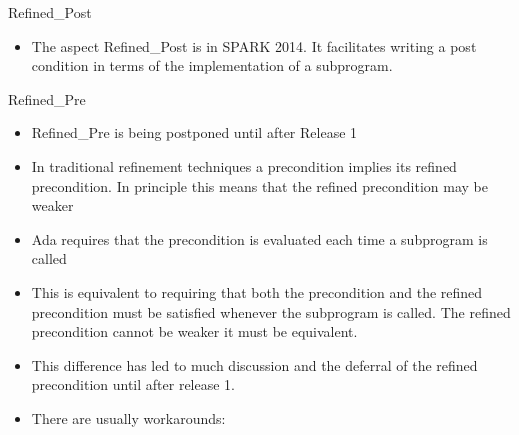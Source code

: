 \documentclass{beamer}
\begin{document}
\begin{frame}{Refined\_Post}

  \begin{itemize}
  \item The aspect Refined\_Post is in SPARK 2014.  It facilitates
    writing a post condition in terms of the implementation of a subprogram. 
  \end{itemize}
 
\end{frame}

\begin{frame}{Refined\_Pre}

  \begin{itemize}
  \item Refined\_Pre is being postponed until after Release 1
  \item In traditional refinement techniques a precondition implies
    its refined precondition.  In principle this means that the
    refined precondition may be weaker
  \item Ada requires that the precondition is evaluated each time a
    subprogram is called
  \item This is equivalent to requiring that both the precondition and
    the refined precondition must be satisfied whenever the subprogram
    is called.  The refined precondition cannot be weaker it must be equivalent.
  \item This difference has led to much discussion and the deferral of
    the refined precondition until after release 1.
  \item There are usually workarounds: 
  \end{itemize}
 
\end{frame}
\end{document}

